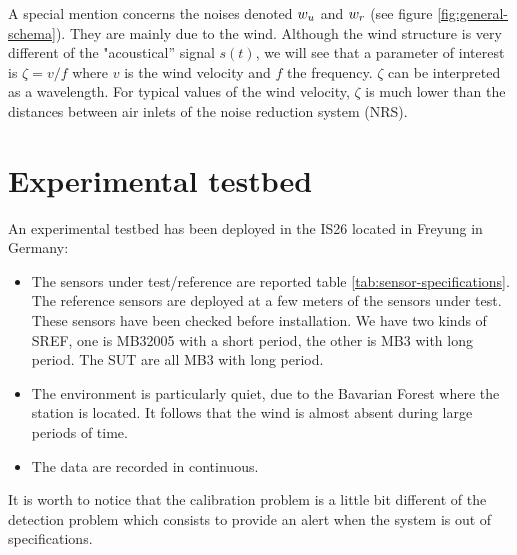 A special mention concerns the noises denoted $w_{{u}}$ and $w_{{r}}$ (see figure \ref{fig:general-schema}). They are mainly due to the wind. Although the wind structure is very different of the  "acoustical'' signal $s(t)$, we will see that a parameter of interest is $\zeta=v/f$ where $v$ is the wind velocity and $f$ the frequency. $\zeta$ can be interpreted 
as a wavelength. For typical values of the wind velocity, $\zeta$ is much lower than the distances between air inlets of the noise reduction system (NRS).

\section{Experimental testbed}
An experimental testbed has been deployed in the IS26 located in Freyung in Germany:
\begin{itemize}
\item
The sensors under test/reference are reported table \ref{tab:sensor-specifications}. The reference sensors are deployed at a few meters of the sensors under test. These sensors have been checked before installation. We have two kinds of SREF, one is MB32005 with a short period, the other is MB3 with long period. The SUT are all MB3 with long period.
\item
The environment is particularly  quiet, due to the Bavarian Forest where the station is located. It follows that the wind is almost absent during large periods of time.

 \item
The data are recorded in continuous.
\end{itemize}

It is worth to notice that the calibration problem is a little bit  different of the detection problem which consists to provide an alert when the system is out of specifications.



